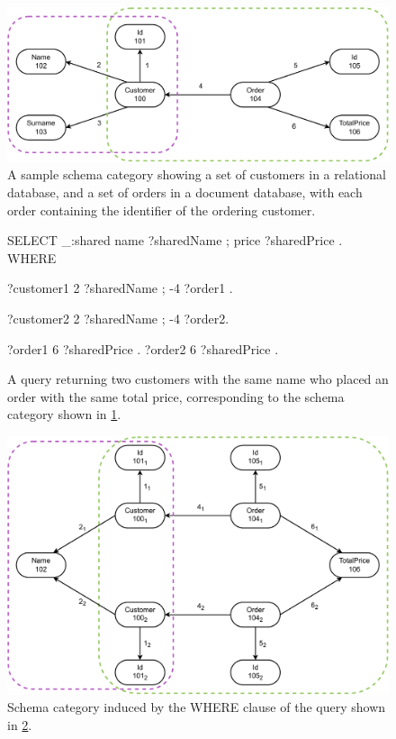 \begin{figure}
\centering
\includegraphics[width=\textwidth]{img/induced-category-original.pdf} 
\caption{A sample schema category showing a set of customers in a relational database, and a set of orders in a document database, with each order containing the identifier of the ordering customer.}
\label{algo:fig:induced_cat_original}
\end{figure}

\begin{figure}
\begin{code}
SELECT {
    _:shared name ?sharedName ;
        price ?sharedPrice .
}
WHERE {
    ?customer1 2 ?sharedName ;
        -4 ?order1 .

    ?customer2 2 ?sharedName ;
        -4 ?order2.

    ?order1 6 ?sharedPrice .
    ?order2 6 ?sharedPrice .
}
\end{code}
\caption{A query returning two customers with the same name who placed an order with the same total price, corresponding to the schema category shown in \cref{algo:fig:induced_cat_original}.}\label{algo:fig:induced_query}
\end{figure}

\begin{figure}
\centering
\includegraphics[width=\textwidth]{img/induced-category-new.pdf} 
\caption{Schema category induced by the WHERE clause of the query shown in \cref{algo:fig:induced_query}.}
\label{algo:fig:induced_cat_new}
\end{figure}

